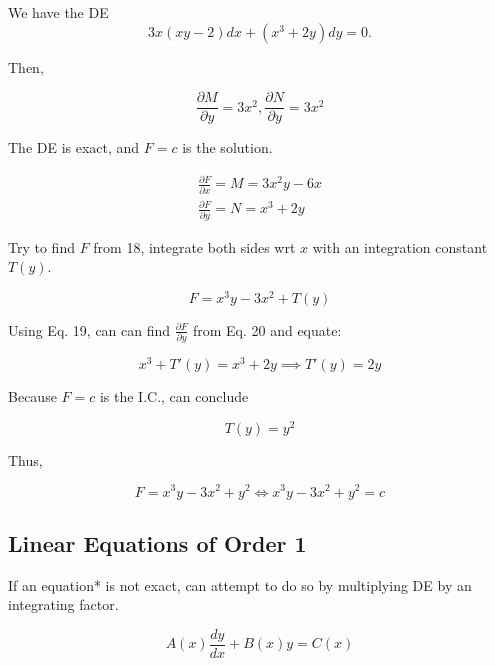 \begin{example} We have the DE
    \begin{equation*}
        3x(xy-2)dx+(x^3+2y)dy=0.
    \end{equation*}

    Then, 

    \begin{equation*}
        \frac{\partial M}{\partial y}=3x^2,\frac{\partial N}{\partial y}=3x^2
    \end{equation*}

    The DE is exact, and $F=c$ is the solution.

    \begin{eqnarray}
        \frac{\partial F}{\partial x}=M=3x^2y-6x\\
        \frac{\partial F}{\partial y}=N=x^3+2y
    \end{eqnarray}

    Try to find $F$ from 18, integrate both sides wrt $x$ with an integration constant $T(y)$.

    \begin{equation*}
        F=x^3y-3x^2+T(y)
    \end{equation*}

    Using Eq. 19, can can find $\frac{\partial F}{\partial y}$ from Eq. 20 and equate:

    \begin{equation*}
        x^3+T'(y)=x^3+2y\implies T'(y)=2y
    \end{equation*}

    Because $F=c$ is the I.C., can conclude 

    \begin{equation*}
        T(y)=y^2
    \end{equation*}

    Thus,

    \begin{equation*}
        F=x^3y-3x^2+y^2\Leftrightarrow x^3y-3x^2+y^2=c
    \end{equation*}
\end{example}

\subsection{Linear Equations of Order 1}

If an equation* is not exact, can attempt to do so by multiplying DE by an integrating factor.

\begin{definition}
    \begin{equation*}
        A(x)\frac{dy}{dx}+B(x)y=C(x)
    \end{equation*}
\end{definition}

